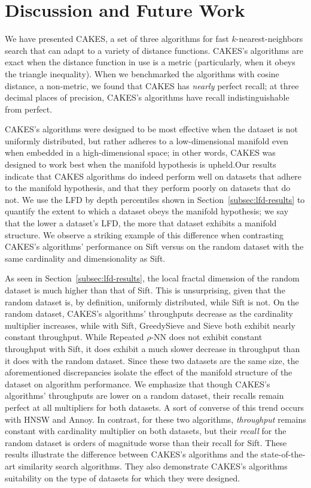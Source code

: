 \section{Discussion and Future Work}
\label{sec:discussion}

We have presented CAKES, a set of three algorithms for fast $k$-nearest-neighbors search that can adapt to a variety of distance functions.
CAKES's algorithms are exact when the distance function in use is a metric (particularly, when it obeys the triangle inequality). When we benchmarked the algorithms with cosine distance, a non-metric, we found that CAKES has \emph{nearly} perfect recall; at three decimal places of precision, CAKES's algorithms have recall indistinguishable from perfect. 


CAKES's algorithms were designed to be most effective when the dataset is not uniformly distributed, but rather adheres to a low-dimensional manifold even when embedded in a high-dimensional space; 
in other words, CAKES was designed to work best when the manifold hypothesis is upheld.Our results indicate that CAKES algorithms do indeed perform well on datasets that adhere to the manifold hypothesis, and that they perform poorly on datasets that do not. 
We use the LFD by depth percentiles shown in Section~\ref{subsec:lfd-results} to quantify the extent to which a dataset obeys the manifold hypothesis; we say that
the lower a dataset's LFD, the more that dataset exhibits a manifold structure. We observe a striking example of this difference when contrasting CAKES's algorithms' performance on Sift versus on the random dataset with the same cardinality and dimensionality as Sift. 


As seen in Section~\ref{subsec:lfd-results}, the local fractal dimension of the random dataset is much higher than that of Sift.
This is unsurprising, given that the random dataset is, by definition, uniformly distributed, while Sift is not.
On the random dataset, CAKES's algorithms' throughputs decrease as the cardinality multiplier increases, while with Sift, GreedySieve and Sieve both exhibit nearly constant throughput.
While Repeated $\rho$-NN does not exhibit constant throughput with Sift, it does exhibit a much slower decrease in throughput than it does with the random dataset.
Since these two datasets are the same size, the aforementioned discrepancies isolate the effect of the manifold structure of the dataset on algorithm performance.
We emphasize that though CAKES's algorithms' throughputs are lower on a random dataset, their recalls remain perfect at all multipliers for both datasets. 
A sort of converse of this trend occurs with HNSW and Annoy. 
In contrast, for these two algorithms, \emph{throughput} remains constant with cardinality multiplier on both datasets, but their \emph{recall} for the random dataset is orders of magnitude worse than their recall for Sift.
These results illustrate the difference between CAKES's algorithms and the state-of-the-art similarity search algorithms. They also demonstrate CAKES's algorithms suitability on the type of datasets for which they were designed.


